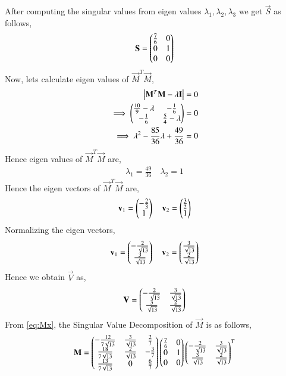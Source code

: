 \documentclass[journal,12pt,twocolumn]{IEEEtran}
\begin{document}
After computing the singular values from eigen values $\lambda_1, \lambda_2, \lambda_3$ we get $\vec{S}$ as follows,
\begin{align}
\mathbf{S}=\begin{pmatrix}\frac{7}{6}&0\\0&1\\0&0\end{pmatrix}
\end{align}
Now, lets calculate eigen values of $\vec{M}^T\vec{M}$,
\begin{align}
\begin{vmatrix}\mathbf{M}^T\mathbf{M} - \lambda\mathbf{I}\end{vmatrix} &= 0\\
\implies\begin{pmatrix}\frac{10}{9}-\lambda&-\frac{1}{6}\\-\frac{1}{6}&\frac{5}{4}-\lambda\end{pmatrix} &=0\\
\implies\lambda^2-\frac{85}{36}\lambda+\frac{49}{36} &=0
\end{align}
Hence eigen values of $\vec{M}^T\vec{M}$ are,
\begin{align}
\lambda_1 = \frac{49}{36}\quad
\lambda_2 = 1
\end{align}
Hence the eigen vectors of $\vec{M}^T\vec{M}$ are,
\begin{align}
\mathbf{v}_1=\begin{pmatrix}-\frac{2}{3}\\1\end{pmatrix} \quad
\mathbf{v}_2=\begin{pmatrix}\frac{3}{2}\\1\end{pmatrix}
\end{align}
Normalizing the eigen vectors,
\begin{align}
\mathbf{v}_1=\begin{pmatrix}-\frac{2}{\sqrt{13}}\\\frac{3}{\sqrt{13}}\end{pmatrix} \quad
\mathbf{v}_2=\begin{pmatrix}\frac{3}{\sqrt{13}}\\\frac{2}{\sqrt{13}}\end{pmatrix}
\end{align}
Hence we obtain $\vec{V}$ as,
\begin{align}
\mathbf{V}=\begin{pmatrix}-\frac{2}{\sqrt{13}}&\frac{3}{\sqrt{13}}\\\frac{3}{\sqrt{13}}&\frac{2}{\sqrt{13}}\end{pmatrix}
\end{align}
From \eqref{eq:Mx}, the Singular Value Decomposition of $\vec{M}$ is as follows,
\begin{align}
\mathbf{M} = \begin{pmatrix}-\frac{12}{7\sqrt{13}}&\frac{3}{\sqrt{13}}&\frac{2}{7}\\\frac{18}{7\sqrt{13}}&\frac{2}{\sqrt{13}}&-\frac{3}{7}\\\frac{13}{7\sqrt{13}}&0&\frac{6}{7}\end{pmatrix}\begin{pmatrix}\frac{7}{6}&0\\0&1\\0&0\end{pmatrix}\begin{pmatrix}-\frac{2}{\sqrt{13}}&\frac{3}{\sqrt{13}}\\\frac{3}{\sqrt{13}}&\frac{2}{\sqrt{13}}\end{pmatrix}^T
\end{align}
\end{document}
